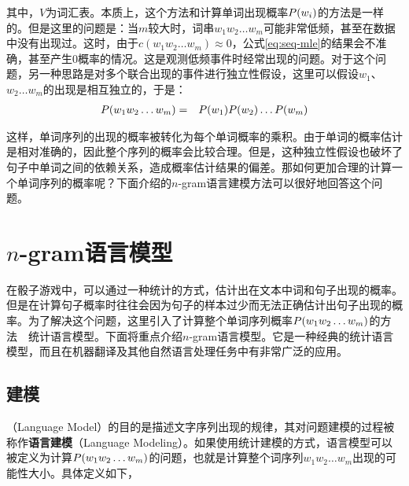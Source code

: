 \noindent 其中，$V$为词汇表。本质上，这个方法和计算单词出现概率${P}(w_i)$的方法是一样的。但是这里的问题是：当$m$较大时，词串$w_1 w_2 \ldots w_m$可能非常低频，甚至在数据中没有出现过。这时，由于$c(w_1 w_2 \ldots w_m) \approx 0$，公式\eqref{eq:seq-mle}的结果会不准确，甚至产生0概率的情况。这是观测低频事件时经常出现的问题。对于这个问题，另一种思路是对多个联合出现的事件进行独立性假设，这里可以假设$w_1$、$w_2\ldots w_m$的出现是相互独立的，于是：
\begin{eqnarray}
{P}(w_1 w_2 \ldots w_m) & = & {P}(w_1) {P}(w_2) \ldots {P}(w_m) \label{eq:seq-independ}
\label{eq:2-21}
\end{eqnarray}

\noindent 这样，单词序列的出现的概率被转化为每个单词概率的乘积。由于单词的概率估计是相对准确的，因此整个序列的概率会比较合理。但是，这种独立性假设也破坏了句子中单词之间的依赖关系，造成概率估计结果的偏差。那如何更加合理的计算一个单词序列的概率呢？下面介绍的$n$-gram语言建模方法可以很好地回答这个问题。


\sectionnewpage
\section{$n$-gram语言模型}

\parinterval 在骰子游戏中，可以通过一种统计的方式，估计出在文本中词和句子出现的概率。但是在计算句子概率时往往会因为句子的样本过少而无法正确估计出句子出现的概率。为了解决这个问题，这里引入了计算整个单词序列概率${P}(w_1 w_2 \ldots w_m)$的方法\ \dash \ 统计语言模型。下面将重点介绍$n$-gram语言模型。它是一种经典的统计语言模型，而且在机器翻译及其他自然语言处理任务中有非常广泛的应用。


\subsection{建模}

（Language Model）的目的是描述文字序列出现的规律，其对问题建模的过程被称作{\small\sffamily\bfseries{语言建模}}（Language Modeling）。如果使用统计建模的方式，语言模型可以被定义为计算${P}(w_1 w_2 \ldots w_m)$的问题，也就是计算整个词序列$w_1 w_2 \ldots w_m$出现的可能性大小。具体定义如下，

